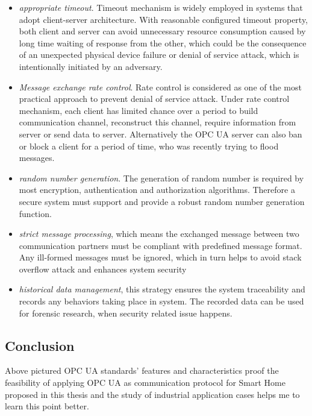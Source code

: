 \begin{itemize}
\item \emph{appropriate timeout}. Timeout mechanism is widely employed in systems that adopt client-server architecture. With reasonable configured timeout property, both client and server can avoid unnecessary resource consumption caused by long time waiting of response from the other, which could be the consequence of an unexpected physical device failure or denial of service attack, which is intentionally initiated by an adversary.
\item \emph{Message exchange rate control}. Rate control is considered as one of the most practical approach to prevent denial of service attack. Under rate control mechanism, each client has limited chance over a period to build communication channel, reconstruct this channel, require information from server or send data to server. Alternatively the OPC UA server can also ban or block a client for a period of time, who was recently trying to flood messages. 
\item \emph{random number generation}. The generation of random number is required by most encryption, authentication and authorization algorithms. Therefore a secure system must support and provide a robust random number generation function.
\item \emph{strict message processing}, which means the exchanged message between two communication partners must be compliant with predefined message format. Any ill-formed messages must be ignored, which in turn helps to avoid stack overflow attack and enhances system security
\item \emph{historical data management}, this strategy ensures the system traceability and records any behaviors taking place in system. The recorded data can be used for forensic research, when security related issue happens.
\end{itemize}
\subsection{Conclusion}
Above pictured OPC UA standards' features and characteristics proof the feasibility of applying OPC UA as communication protocol for Smart Home proposed in this thesis and the study of industrial application cases helps me to learn this point better.

